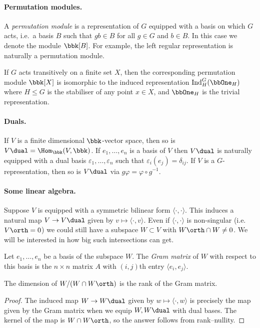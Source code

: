 \paragraph{Permutation modules.} A \emph{permutation module} is a representation
of $G$ equipped with a basis on which $G$ acts, i.e.\ a basis $B$ such that
$gb\in B$ for all $g\in G$ and $b\in B$. In this case we denote the module
$\bbk[B]$. For example, the left regular
representation is naturally a permutation module.

\begin{proposition}
    If $G$ acts transitively on a finite set $X$, then the corresponding
    permutation module $\bbk [X]$ is isomorphic to the induced representation
    $\textnormal{Ind}_H^G(\bbOne_H)$ where $H\leq G$ is the stabiliser of any point
    $x\in X$, and $\bbOne_H$ is the trivial representation.
\end{proposition}

\paragraph{Duals.} If $V$ is a finite dimensional
$\bbk$-vector space, then so is $V\dual = \Hom_\bbk (V,\bbk)$. If $e_1,\ldots,
e_n$ is a basis of $V$ then $V\dual$ is naturally equipped with a dual basis
$\varepsilon_1,\ldots, \varepsilon_n$ such that
$\varepsilon_i(e_j)=\delta_{ij}$. If $V$ is a $G$-representation, then so is $V\dual$ via $g\varphi = \varphi \circ g^{-1}$.

\paragraph{Some linear algebra.}
Suppose $V$ is equipped with a symmetric bilinear form $\langle \cdot, \cdot
\rangle$. This induces a natural map $V\to V\dual$ given by $v\mapsto \langle
\cdot, v\rangle$. Even if $\langle \cdot,\cdot \rangle$ is non-singular (i.e.\
$V\orth = 0$)  we could still have a subspace $W\subset V$ with $W\orth \cap W
\neq 0 $. We will be interested in how big such intersections can get. 

Let $e_1,\ldots, e_n$ be a basis of the subspace $W$. The \emph{Gram matrix} of
$W$ with respect to this basis is the $n\times n$ matrix $A$ with $(i,j)$th
entry $\langle e_i, e_j\rangle$.

\begin{proposition}
    The dimension of $W/(W\cap W\orth)$ is the rank of the Gram matrix.

    \begin{proof}
        The induced map $W\to W\dual$ given by $w\mapsto \langle \cdot,
        w\rangle$ is precisely the map given by the Gram matrix when we equip
        $W, W\dual$ with dual bases. The kernel of the map is $W\cap W\orth$, so
        the answer follows from rank--nullity.
    \end{proof}
\end{proposition}

